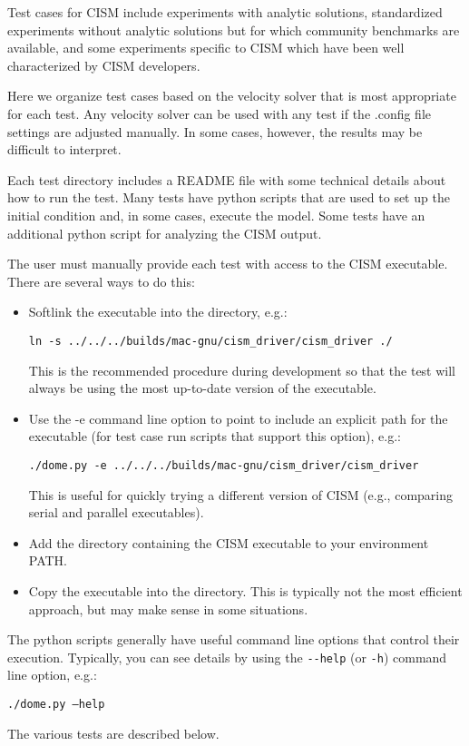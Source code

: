 
\label{ch:tests}

Test cases for CISM include experiments with analytic solutions, standardized experiments
without analytic solutions but for which community benchmarks are available, and
some experiments specific to CISM which have been well characterized by CISM developers.

Here we organize test cases based on the velocity solver that is most appropriate
for each test.  Any velocity solver can be used with any test
if the .config file settings are adjusted manually.  In some cases, however, the results
may be difficult to interpret.

Each test directory includes a README file with some technical details 
about how to run the test.  Many tests have python scripts that are used to set up
the initial condition and, in some cases, execute the model.  Some tests
have an additional python script for analyzing the CISM output.

The user must manually provide each test with access to the CISM executable.
There are several ways to do this:

\begin{itemize}
  \item Softlink the executable into the directory, e.g.:

        \texttt{ln -s ../../../builds/mac-gnu/cism\_driver/cism\_driver ./}

        This is the recommended procedure during development so that the test
        will always be using the most up-to-date version of the executable.

  \item Use the -e command line option to point to include an explicit path for the executable (for test case run scripts that support this option), e.g.:

        \texttt{./dome.py -e ../../../builds/mac-gnu/cism\_driver/cism\_driver}

        This is useful for quickly trying a different version of CISM (e.g., comparing 
        serial and parallel executables).

  \item Add the directory containing the CISM executable to your environment PATH.

  \item Copy the executable into the directory.  This is typically not the most efficient approach,
        but may make sense in some situations.
\end{itemize}

The python scripts generally have useful
command line options that control their execution.  Typically, you can see details 
by using the \texttt{-{}-help} (or \texttt{-h}) command line option, e.g.:

\texttt{./dome.py --help}

The various tests are described below.





